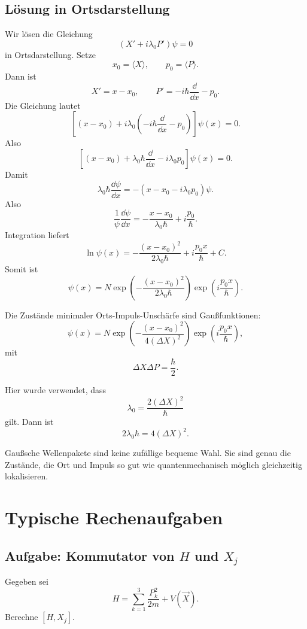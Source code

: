 \subsection{Lösung in Ortsdarstellung}

Wir lösen die Gleichung
\[
    (X'+i\lambda_0P')\psi=0
\]
in Ortsdarstellung. Setze
\[
    x_0=\langle X\rangle,
    \qquad
    p_0=\langle P\rangle.
\]
Dann ist
\[
    X'=x-x_0,
    \qquad
    P'=-i\hbar\frac{\dd}{\dd x}-p_0.
\]
Die Gleichung lautet
\[
    \left[(x-x_0)+i\lambda_0\left(-i\hbar\frac{\dd}{\dd x}-p_0\right)\right]\psi(x)=0.
\]
Also
\[
    \left[(x-x_0)+\lambda_0\hbar\frac{\dd}{\dd x}-i\lambda_0p_0\right]\psi(x)=0.
\]
Damit
\[
    \lambda_0\hbar\frac{\dd\psi}{\dd x}
    =-\left(x-x_0-i\lambda_0p_0\right)\psi.
\]
Also
\[
    \frac{1}{\psi}\frac{\dd\psi}{\dd x}
    =-\frac{x-x_0}{\lambda_0\hbar}+i\frac{p_0}{\hbar}.
\]
Integration liefert
\[
    \ln\psi(x)
    =-\frac{(x-x_0)^2}{2\lambda_0\hbar}+i\frac{p_0x}{\hbar}+C.
\]
Somit ist
\[
    \psi(x)=N\exp\left(-\frac{(x-x_0)^2}{2\lambda_0\hbar}\right)
    \exp\left(i\frac{p_0x}{\hbar}\right).
\]

\begin{formulabox}
Die Zustände minimaler Orts-Impuls-Unschärfe sind Gaußfunktionen:
\[
    \psi(x)=N\exp\left(-\frac{(x-x_0)^2}{4(\Delta X)^2}\right)
    \exp\left(i\frac{p_0x}{\hbar}\right),
\]
mit
\[
    \Delta X\Delta P=\frac{\hbar}{2}.
\]
\end{formulabox}

Hier wurde verwendet, dass
\[
    \lambda_0=\frac{2(\Delta X)^2}{\hbar}
\]
gilt. Dann ist
\[
    2\lambda_0\hbar=4(\Delta X)^2.
\]

\begin{conceptbox}
Gaußsche Wellenpakete sind keine zufällige bequeme Wahl. Sie sind genau die Zustände, die Ort und Impuls so gut wie quantenmechanisch möglich gleichzeitig lokalisieren.
\end{conceptbox}

\section{Typische Rechenaufgaben}

\subsection{Aufgabe: Kommutator von $H$ und $X_j$}

\begin{examplebox}
Gegeben sei
\[
    H=\sum_{k=1}^3\frac{P_k^2}{2m}+V(\vec X).
\]
Berechne $[H,X_j]$.
\end{examplebox}

